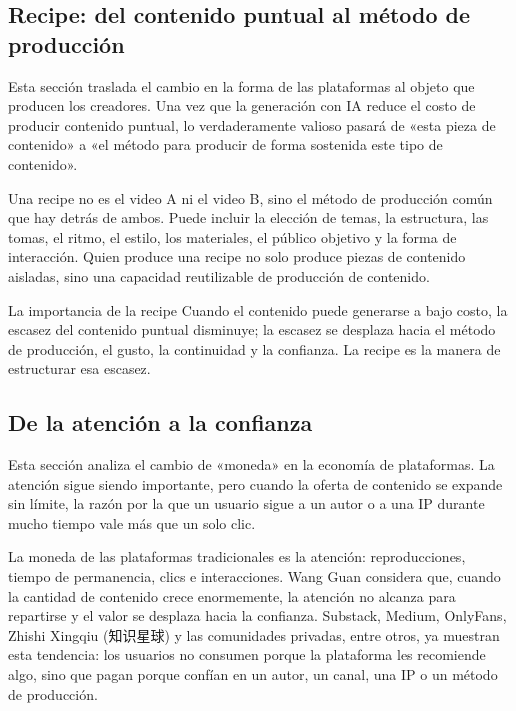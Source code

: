 \documentclass[a4paper]{article}
\begin{document}
\subsection{Recipe: del contenido puntual al método de producción}

Esta sección traslada el cambio en la forma de las plataformas al objeto que producen los creadores. Una vez que la generación con IA reduce el costo de producir contenido puntual, lo verdaderamente valioso pasará de «esta pieza de contenido» a «el método para producir de forma sostenida este tipo de contenido».

Una recipe no es el video A ni el video B, sino el método de producción común que hay detrás de ambos. Puede incluir la elección de temas, la estructura, las tomas, el ritmo, el estilo, los materiales, el público objetivo y la forma de interacción. Quien produce una recipe no solo produce piezas de contenido aisladas, sino una capacidad reutilizable de producción de contenido.

\begin{importantbox}{La importancia de la recipe}
Cuando el contenido puede generarse a bajo costo, la escasez del contenido puntual disminuye; la escasez se desplaza hacia el método de producción, el gusto, la continuidad y la confianza. La recipe es la manera de estructurar esa escasez.
\end{importantbox}

\subsection{De la atención a la confianza}

Esta sección analiza el cambio de «moneda» en la economía de plataformas. La atención sigue siendo importante, pero cuando la oferta de contenido se expande sin límite, la razón por la que un usuario sigue a un autor o a una IP durante mucho tiempo vale más que un solo clic.

La moneda de las plataformas tradicionales es la atención: reproducciones, tiempo de permanencia, clics e interacciones. Wang Guan considera que, cuando la cantidad de contenido crece enormemente, la atención no alcanza para repartirse y el valor se desplaza hacia la confianza. Substack, Medium, OnlyFans, Zhishi Xingqiu (知识星球) y las comunidades privadas, entre otros, ya muestran esta tendencia: los usuarios no consumen porque la plataforma les recomiende algo, sino que pagan porque confían en un autor, un canal, una IP o un método de producción.
\end{document}
